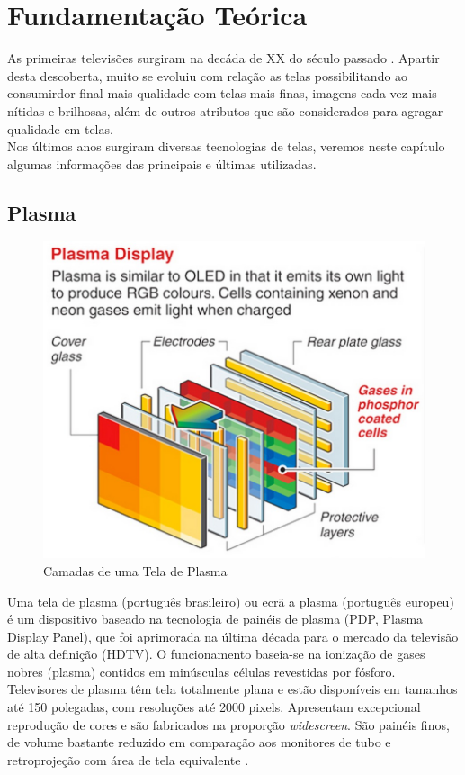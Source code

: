 \chapter{Fundamentação Teórica}
\label{cap:fundamentacao}

As primeiras televisões surgiram na decáda de XX do século passado \cite{WikipediaTelevisao}. Apartir desta descoberta, muito se evoluiu com relação as telas possibilitando ao consumirdor final mais qualidade com telas mais finas, imagens cada vez mais nítidas e brilhosas, além de outros atributos que são considerados para agragar qualidade em telas.\\

Nos últimos anos surgiram diversas tecnologias de telas, veremos neste capítulo algumas informações das principais e últimas utilizadas.

\section{Plasma}
\label{sec:plasma}

\begin{figure}[!ht]
  \centering
  \includegraphics[width=.40\textwidth]{./figuras/camadas_plasma} 
  \caption{Camadas de uma Tela de Plasma}
  \label{fig:camadas_plasma} 
\end{figure}

Uma tela de plasma (português brasileiro) ou ecrã a plasma (português europeu) é um dispositivo baseado na tecnologia de painéis de plasma (PDP, Plasma Display Panel), que foi aprimorada na última década para o mercado da televisão de alta definição (HDTV). O funcionamento baseia-se na ionização de gases nobres (plasma) contidos em minúsculas células revestidas por fósforo.\\

Televisores de plasma têm tela totalmente plana e estão disponíveis em tamanhos até 150 polegadas, com resoluções até 2000 pixels. Apresentam excepcional reprodução de cores e são fabricados na proporção \textit{widescreen}. São painéis finos, de volume bastante reduzido em comparação aos monitores de tubo e retroprojeção com área de tela equivalente \cite{WikipediaTelaPlasma}. \\

